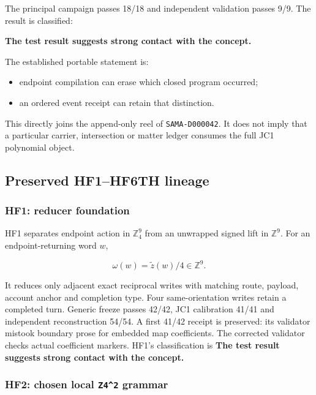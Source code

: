 The principal campaign passes 18/18 and independent validation passes
9/9. The result is classified:

\textbf{The test result suggests strong contact with the concept.}

The established portable statement is:

\begin{itemize}
\tightlist
\item
  endpoint compilation can erase which closed program occurred;
\item
  an ordered event receipt can retain that distinction.
\end{itemize}

This directly joins the append-only reel of \texttt{SAMA-D000042}. It
does not imply that a particular carrier, intersection or matter ledger
consumes the full JC1 polynomial object.

\subsection{Preserved HF1--HF6TH
lineage}\label{viii-ch11-preserved-hf1hf6th-lineage}

\subsubsection{HF1: reducer foundation}\label{viii-ch11-hf1-reducer-foundation}

HF1 separates endpoint action in \(\mathbb Z_4^9\) from an unwrapped
signed lift in \(\mathbb Z^9\). For an endpoint-returning word \(w\),

\[
\omega(w)=\widetilde z(w)/4\in\mathbb Z^9.
\]

It reduces only adjacent exact reciprocal writes with matching route,
payload, account anchor and completion type. Four same-orientation
writes retain a completed turn. Generic freeze passes 42/42, JC1
calibration 41/41 and independent reconstruction 54/54. A first 41/42
receipt is preserved: its validator mistook boundary prose for embedded
map coefficients. The corrected validator checks actual coefficient
markers. HF1's classification is \textbf{The test result suggests strong
contact with the concept.}

\subsubsection{\texorpdfstring{HF2: chosen local \texttt{Z4\^{}2}
grammar}{HF2: chosen local Z4\^{}2 grammar}}\label{viii-ch11-hf2-chosen-local-z42-grammar}

